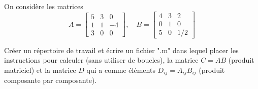 On considère les matrices
\begin{equation*}
  A = \begin{bmatrix}
        5 & 3 & 0  \\
        1 & 1 & -4 \\
        3 & 0 & 0
      \end{bmatrix}
  , \quad 
  B = \begin{bmatrix}
        4 & 3 & 2  \\
        0 & 1 & 0  \\
        5 & 0 & 1/2
      \end{bmatrix}
\end{equation*}


Créer un répertoire de travail et écrire un fichier ".m" dans lequel placer les instructions pour calculer (sans utiliser de boucles), la matrice $C = AB$ (produit matriciel) et la matrice $D$ qui a comme éléments $D_{ij} = A_{ij} B_{ij}$ (produit composante par composante).




